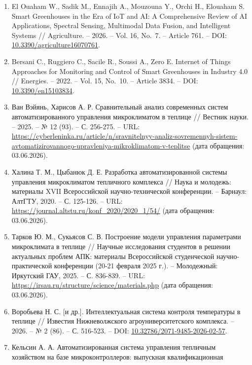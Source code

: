 \documentclass[a4paper,14pt]{extarticle}
\providecommand{\tightlist}{%
  \setlength{\itemsep}{0pt}\setlength{\parskip}{0pt}}
\begin{document}
\begin{enumerate}
\def\labelenumi{\arabic{enumi}.}
\tightlist
\item
  El Ouaham W., Sadik M., Ennajih A., Mouzouna Y., Orchi H., Elouaham S.
  Smart Greenhouses in the Era of IoT and AI: A Comprehensive Review of
  AI Applications, Spectral Sensing, Multimodal Data Fusion, and
  Intelligent Systems // Agriculture. -- 2026. -- Vol. 16, No.~7. --
  Article 761. -- DOI:
  \href{https://doi.org/10.3390/agriculture16070761}{10.3390/agriculture16070761}.
\item
  Bersani C., Ruggiero C., Sacile R., Soussi A., Zero E. Internet of
  Things Approaches for Monitoring and Control of Smart Greenhouses in
  Industry 4.0 // Energies. -- 2022. -- Vol. 15, No.~10. -- Article
  3834. -- DOI:
  \href{https://doi.org/10.3390/en15103834}{10.3390/en15103834}.
\item
  Ван Вэйянь, Харисов А. Р. Сравнительный анализ современных систем
  автоматизированного управления микроклиматом в теплице // Вестник
  науки. -- 2025. -- № 12 (93). -- С. 256-275. -- URL:
  \url{https://cyberleninka.ru/article/n/sravnitelnyy-analiz-sovremennyh-sistem-avtomatizirovannogo-upravleniya-mikroklimatom-v-teplitse}
  (дата обращения: 03.06.2026).
\item
  Халина Т. М., Цыбанюк Д. Е. Разработка автоматизированной системы
  управления микроклиматом тепличного комплекса // Наука и молодежь:
  материалы XVII Всероссийской научно-технической конференции. --
  Барнаул: АлтГТУ, 2020. -- С. 125-126. -- URL:
  \url{https://journal.altstu.ru/konf_2020/2020_1/54/} (дата обращения:
  03.06.2026).
\item
  Тарков Ю. М., Сукьясов С. В. Построение модели управления параметрами
  микроклимата в теплице // Научные исследования студентов в решении
  актуальных проблем АПК: материалы Всероссийской студенческой
  научно-практической конференции (20-21 февраля 2025 г.). --
  Молодежный: Иркутский ГАУ, 2025. -- С. 836-839. -- URL:
  \url{https://irsau.ru/structure/science/materials.php} (дата
  обращения: 03.06.2026).
\item
  Воробьева Н. С. {[}и др.{]}. Интеллектуальная система контроля
  температуры в теплице // Известия Нижневолжского агроуниверситетского
  комплекса. -- 2026. -- № 2 (86). -- С. 516-523. -- DOI:
  \href{https://doi.org/10.32786/2071-9485-2026-02-57}{10.32786/2071-9485-2026-02-57}.
\item
  Кельсин А. А. Автоматизированная система управления тепличным
  хозяйством на базе микроконтроллеров: выпускная квалификационная

\end{enumerate}
\end{document}
